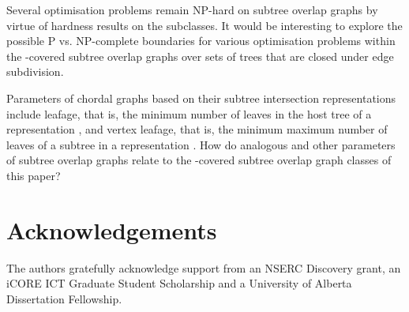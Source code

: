 \documentclass[
final
]{dmtcs-episciences}        \usepackage{graphics, amsthm, amsmath, amssymb, algorithm, algorithmic}
\begin{document}
Several optimisation problems remain NP-hard on subtree overlap graphs by virtue of hardness results on the subclasses. It would be interesting to explore the possible P vs. NP-complete boundaries for various optimisation problems within the 
-covered subtree overlap graphs
over sets  of trees that are closed under edge subdivision.

Parameters of chordal graphs based on their subtree intersection representations include leafage, that is,
the minimum number of leaves in the host tree of a representation \cite{LinMcKeeWest}, and vertex leafage, that is,
the minimum maximum number of leaves of a subtree in a representation \cite{ChaplickStacho}.
How do analogous and other parameters of subtree overlap graphs relate to the -covered subtree overlap graph classes of this paper?


\section{Acknowledgements}
The authors gratefully acknowledge support from an NSERC Discovery grant, an iCORE ICT Graduate Student Scholarship and a University of Alberta Dissertation Fellowship.


\end{document}
